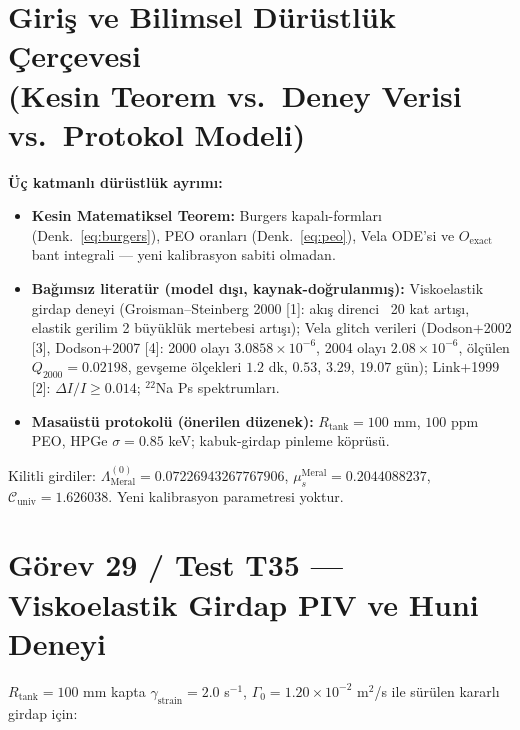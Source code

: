 \documentclass[12pt,a4paper]{article}
\begin{document}
\section[Giriş ve Bilimsel Dürüstlük Çerçevesi]{Giriş ve Bilimsel Dürüstlük Çerçevesi \\ (Kesin Teorem vs.\ Deney Verisi vs.\ Protokol Modeli)}

\textbf{Üç katmanlı dürüstlük ayrımı:}
\begin{itemize}
    \item \textbf{Kesin Matematiksel Teorem:} Burgers kapalı-formları
    (Denk.~\ref{eq:burgers}), PEO oranları (Denk.~\ref{eq:peo}), Vela ODE'si ve
    $O_{\mathrm{exact}}$ bant integrali --- yeni kalibrasyon sabiti olmadan.
    \item \textbf{Bağımsız literatür (model dışı, kaynak-doğrulanmış):}
    Viskoelastik girdap deneyi (Groisman--Steinberg 2000 [1]: akış direnci
    ~20 kat artışı, elastik gerilim 2 büyüklük mertebesi artışı);
    Vela glitch verileri (Dodson+2002 [3], Dodson+2007 [4]: 2000 olayı
    $3.0858\times10^{-6}$, 2004 olayı $2.08\times10^{-6}$, ölçülen
    $Q_{2000}=0.02198$, gevşeme ölçekleri $1.2$ dk, $0.53$, $3.29$, $19.07$ gün);
    Link+1999 [2]: $\Delta I/I\ge 0.014$; $^{22}$Na Ps spektrumları.
    \item \textbf{Masaüstü protokolü (önerilen düzenek):} $R_{\mathrm{tank}}=100$
    mm, $100$ ppm PEO, HPGe $\sigma=0.85$ keV; kabuk-girdap pinleme köprüsü.
\end{itemize}
Kilitli girdiler: $\Lambda_{\mathrm{Meral}}^{(0)} = 0.07226943267767906$,
$\mu_s^{\mathrm{Meral}} = 0.2044088237$,
$\mathcal{C}_{\mathrm{univ}} = 1.626038$. Yeni kalibrasyon parametresi yoktur.

\section{Görev 29 / Test T35 --- Viskoelastik Girdap PIV ve Huni Deneyi}

$R_{\mathrm{tank}}=100$ mm kapta $\gamma_{\mathrm{strain}}=2.0$ s$^{-1}$,
$\Gamma_0=1.20\times 10^{-2}$ m$^2$/s ile sürülen kararlı girdap için:
\end{document}
